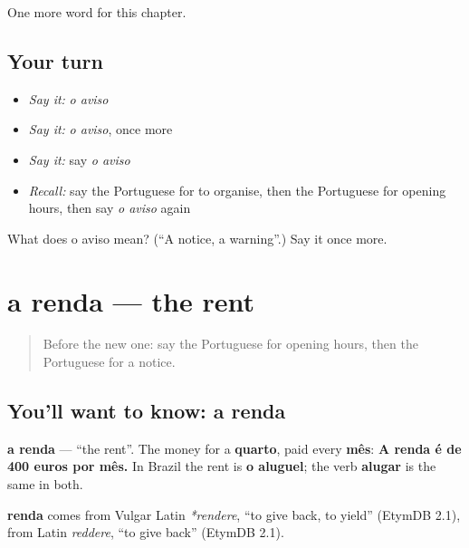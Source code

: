 \begin{grammarlens}[title={What you've built}]
One more word for this chapter.
\end{grammarlens}

\subsection*{Your turn}
\begin{itemize}
\raggedright
  \item \emph{Say it:} \emph{o aviso}
  \item \emph{Say it:} \emph{o aviso}, once more
  \item \emph{Say it:} say \emph{o aviso}
  \item \emph{Recall:} say the Portuguese for to organise, then the Portuguese for opening hours, then say \emph{o aviso} again
\end{itemize}

\begin{tcolorbox}[breakable,colback=teal!4,colframe=teal!35!black,title={Before you move on}]
What does o aviso mean? (\textquotedblleft{}A notice, a warning\textquotedblright{}.) Say it once more.
\end{tcolorbox}
\section[a renda]{a renda — the rent}

\label{lesson:PT-C137-a-renda}



\begin{quote}
Before the new one: say the Portuguese for opening hours, then the Portuguese for a notice.
\end{quote}

\subsection*{You'll want to know: a renda}
\textbf{a renda} — \textquotedblleft{}the rent\textquotedblright{}. The money for a \textbf{quarto}, paid every \textbf{mês}: \textbf{A renda é de 400 euros por mês.} In Brazil the rent is \textbf{o aluguel}; the verb \textbf{alugar} is the same in both.

\begin{cousinweb}
\textbf{renda} comes from Vulgar Latin \emph{*rendere}, \textquotedblleft{}to give back, to yield\textquotedblright{} (EtymDB 2.1), from Latin \emph{reddere}, \textquotedblleft{}to give back\textquotedblright{} (EtymDB 2.1).
\end{cousinweb}

